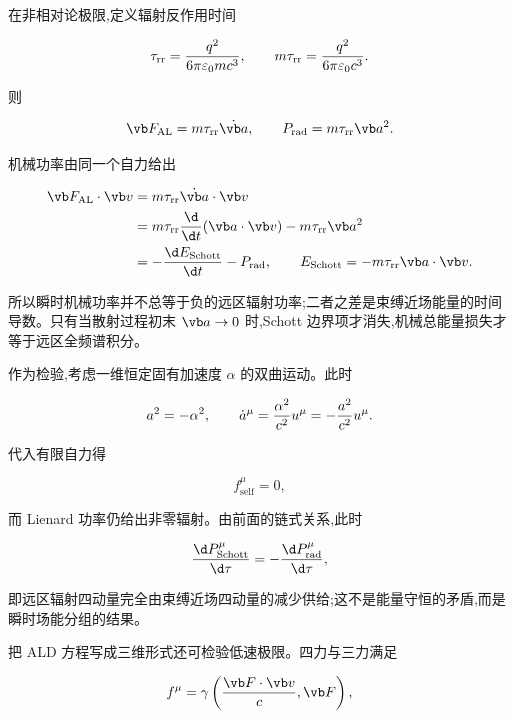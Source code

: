 在非相对论极限,定义辐射反作用时间

\begin{equation*}
 \tau_{\mathrm{rr}}
 ={q^2\over6\pi\varepsilon_0mc^3},
 \qquad
 m\tau_{\mathrm{rr}}={q^2\over6\pi\varepsilon_0c^3}.
\end{equation*}

则

\begin{equation*}
 \vb F_{\mathrm{AL}}=m\tau_{\mathrm{rr}}\dot{\vb a},
 \qquad
 P_{\mathrm{rad}}=m\tau_{\mathrm{rr}}\vb a^2.
\end{equation*}

机械功率由同一个自力给出

\begin{align*}
 \vb F_{\mathrm{AL}}\cdot\vb v
 &=m\tau_{\mathrm{rr}}\dot{\vb a}\cdot\vb v\\
 &=m\tau_{\mathrm{rr}}{\d\over\d t}(\vb a\cdot\vb v)
 -m\tau_{\mathrm{rr}}\vb a^2\\
 &=-{\d E_{\mathrm{Schott}}\over\d t}-P_{\mathrm{rad}},
 \qquad
 E_{\mathrm{Schott}}=-m\tau_{\mathrm{rr}}\vb a\cdot\vb v.
\end{align*}

所以瞬时机械功率并不总等于负的远区辐射功率;二者之差是束缚近场能量的时间导数。只有当散射过程初末 $\vb a\to0$ 时,Schott 边界项才消失,机械总能量损失才等于远区全频谱积分。

作为检验,考虑一维恒定固有加速度 $\alpha$ 的双曲运动。此时

\begin{equation*}
 a^2=-\alpha^2,
 \qquad
 \dot a^\mu={\alpha^2\over c^2}u^\mu
 =-{a^2\over c^2}u^\mu.
\end{equation*}

代入有限自力得

\begin{equation*}
 f_{\mathrm{self}}^\mu=0,
\end{equation*}

而 Lienard 功率仍给出非零辐射。由前面的链式关系,此时

\begin{equation*}
 {\d P_{\mathrm{Schott}}^\mu\over\d\tau}
 =-{\d P_{\mathrm{rad}}^\mu\over\d\tau},
\end{equation*}

即远区辐射四动量完全由束缚近场四动量的减少供给;这不是能量守恒的矛盾,而是瞬时场能分组的结果。

把 ALD 方程写成三维形式还可检验低速极限。四力与三力满足

\begin{equation*}
 f^\mu=\gamma\left({\vb F\cdot\vb v\over c},\vb F\right),
\end{equation*}

